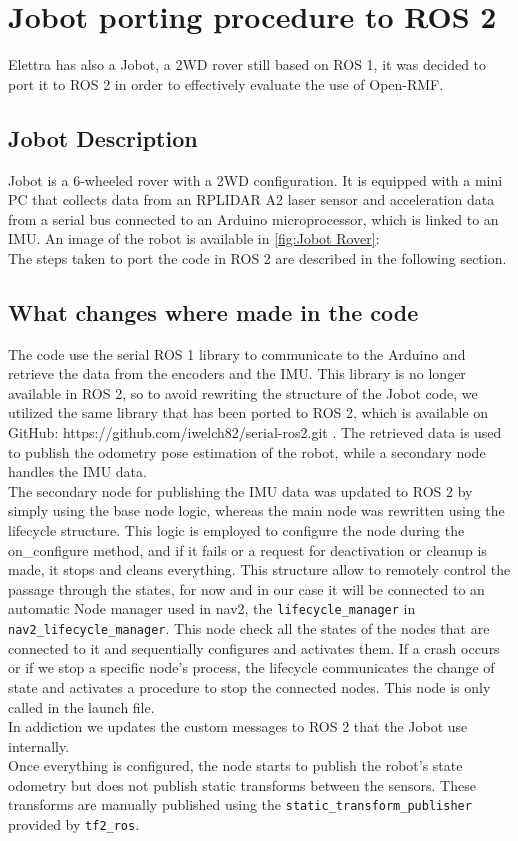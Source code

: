 \chapter{Jobot porting procedure to ROS 2}


Elettra has also a Jobot, a 2WD rover still based on ROS 1, it was decided to port it to ROS 2 in order to effectively evaluate the use of Open-RMF.
\section{Jobot Description}
Jobot is a 6-wheeled rover with a 2WD configuration. It is equipped with a mini PC that collects data from an RPLIDAR A2 laser sensor and acceleration data from a serial bus connected to an Arduino microprocessor, which is linked to an IMU. An image of the robot is available in \ref{fig:Jobot Rover}:\\
The steps taken to port the code in ROS 2 are described in the following section.

\section{What changes where made in the code}

The code use the serial ROS 1 library to communicate to the Arduino and retrieve the data from the encoders and the IMU. This library is no longer available in ROS 2, so to avoid rewriting the structure of the Jobot code, we utilized the same library that has been ported to ROS 2, which is available on GitHub: 
https://github.com/iwelch82/serial-ros2.git .
The retrieved data is used to publish the odometry pose estimation of the robot, while a secondary node handles the IMU data.\\
The secondary node for publishing the IMU data was updated to ROS 2 by simply using the base node logic, whereas the main node was rewritten using the lifecycle structure. This logic is employed to configure the node during the on\_configure method, and if it fails or a request for deactivation or cleanup is made, it stops and cleans everything. This structure allow to remotely control the passage through the states, for now and in our case it will be connected to an automatic Node manager used in nav2, the \texttt{lifecycle\_manager} in \texttt{nav2\_lifecycle\_manager}. This node check all the states of the nodes that are connected to it and sequentially configures and activates them. If a crash occurs or if we stop a specific node's process, the lifecycle communicates the change of state and activates a procedure to stop the connected nodes. This node is only called in the launch file.\\
In addiction we updates the custom messages to ROS 2 that the Jobot use internally.\\
Once everything is configured, the node starts to publish the robot's state odometry but does not publish static transforms between the sensors. These transforms are manually published using the \texttt{static\_transform\_publisher} provided by \texttt{tf2\_ros}.\\

